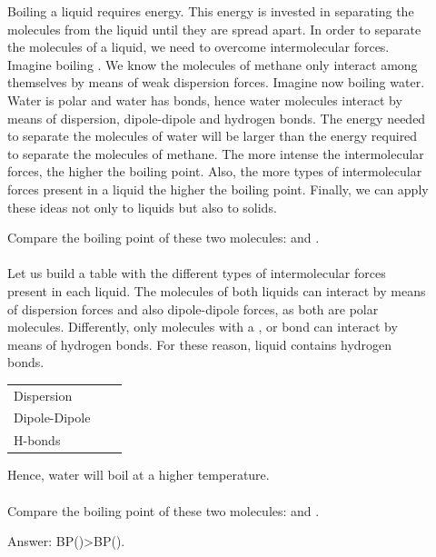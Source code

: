 \documentclass[main.tex]{subfiles}
\begin{document}
\begin{description}
\item[] Boiling a liquid requires energy. This energy is invested in separating the molecules from the liquid until they are spread apart. In order to separate the molecules of a liquid, we need to overcome intermolecular forces. Imagine boiling . We know the molecules of methane only interact among themselves by means of weak dispersion forces. Imagine now boiling water. Water is polar and water has  bonds, hence water molecules interact by means of dispersion, dipole-dipole and hydrogen bonds. The energy needed to separate the molecules of water will be larger than the energy required to separate the molecules of methane. The more intense the intermolecular forces, the higher the boiling point. Also, the more types of intermolecular forces present in a liquid the higher the boiling point. Finally, we can apply these ideas not only to liquids but also to solids.
\begin{example} %
Compare the boiling point of these two molecules:  and .
\\
\\
Let us build a table with the different types of intermolecular forces present in each liquid. The molecules of both liquids can interact by means of dispersion forces and also dipole-dipole forces, as both are polar molecules. Differently, only molecules with a  ,  or  bond can interact by means of hydrogen bonds. For these reason,   liquid contains  hydrogen bonds.
\begin{tabularx}{\textwidth}{
    >{\centering}m{.185\linewidth} 
    *{2}{Y} }
  \toprule
 &     &    \\
    \midrule
   Dispersion & 	\checkmark &	\checkmark	  		   \\
  Dipole-Dipole&  \checkmark	 &	\checkmark	 	     \\
      H-bonds & 	\xmark  &\checkmark 		   		\\    
    \bottomrule
\end{tabularx}
Hence, water will boil at a higher temperature.
\\
\faDiamond\ \\
Compare the boiling point of these two molecules:  and .
\begin{flushright} Answer: BP()>BP().\end{flushright}
\end{example}%
\end{description}
\end{document}
